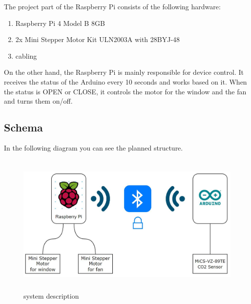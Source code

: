 The project part of the Raspberry Pi consists of the following hardware:

\begin{enumerate}[label*=\arabic*.]
    \item \label{io.1} Raspberry Pi 4 Model B 8GB
    \item \label{io.2} 2x Mini Stepper Motor Kit ULN2003A with 28BYJ-48 
    \item \label{io.3} cabling
\end{enumerate}

On the other hand, the Raspberry Pi is mainly responsible for device control. It receives the status of the Arduino every 10 seconds and works based on it. When the status is OPEN or CLOSE, it controls the motor for the window and the fan and turns them on/off.

\newpage

\subsection{Schema}

In the following diagram you can see the planned structure.

\begin{figure}[h]
	\includegraphics[height=70mm]{images/schema_technologien.jpg}
	\centering
	\caption{system description}
	\label{fig:system}
\end{figure}






